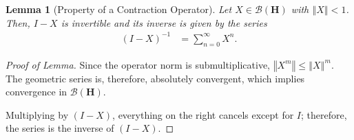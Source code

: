 \documentclass[12pt]{extarticle}
\newcommand{\norm}[1]{\left\Vert #1\right\Vert}
\theoremstyle{plain}
\newtheorem*{lemma}{Lemma}%
\theoremstyle{definition}
\theoremstyle{remark}
\renewcommand{\newline}{\hfill\break}
\begin{document}
  \begin{lemma}[Property of a Contraction Operator]
    Let $X\in \mathcal{B}\left(\mathbf{H}\right)$ with $\norm{X} < 1$. Then, $I-X$ is invertible and its inverse is given by the series
    \begin{align*}
      \left(I-X\right)^{-1} &= \sum_{n=0}^{\infty}X^n.
    \end{align*}
  \end{lemma}
  \begin{proof}[Proof of Lemma]
    Since the operator norm is submultiplicative, $\norm{X^m}\leq \norm{X}^{m}$. The geometric series is, therefore, absolutely convergent, which implies convergence in $\mathcal{B}\left(\mathbf{H}\right)$.\newline

    Multiplying by $(I-X)$, everything on the right cancels except for $I$; therefore, the series is the inverse of $(I-X)$.
  \end{proof}
\end{document}

